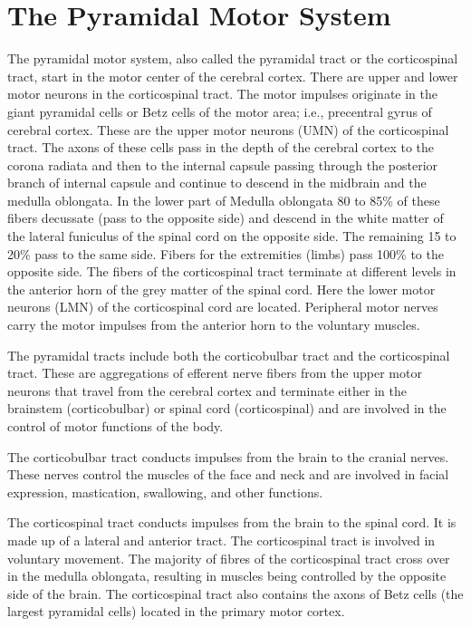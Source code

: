 \hypertarget{the-pyramidal-motor-system}{%
\section{The Pyramidal Motor System}\label{the-pyramidal-motor-system}}

The pyramidal motor system, also called the pyramidal tract or the corticospinal tract, start in the motor center of the cerebral cortex. There are upper and lower motor neurons in the corticospinal tract. The motor impulses originate in the giant pyramidal cells or Betz cells of the motor area; i.e., precentral gyrus of cerebral cortex. These are the upper motor neurons (UMN) of the corticospinal tract. The axons of these cells pass in the depth of the cerebral cortex to the corona radiata and then to the internal capsule passing through the posterior branch of internal capsule and continue to descend in the midbrain and the medulla oblongata. In the lower part of Medulla oblongata 80 to 85\% of these fibers decussate (pass to the opposite side) and descend in the white matter of the lateral funiculus of the spinal cord on the opposite side. The remaining 15 to 20\% pass to the same side. Fibers for the extremities (limbs) pass 100\% to the opposite side. The fibers of the corticospinal tract terminate at different levels in the anterior horn of the grey matter of the spinal cord. Here the lower motor neurons (LMN) of the corticospinal cord are located. Peripheral motor nerves carry the motor impulses from the anterior horn to the voluntary muscles.

The pyramidal tracts include both the corticobulbar tract and the corticospinal tract. These are aggregations of efferent nerve fibers from the upper motor neurons that travel from the cerebral cortex and terminate either in the brainstem (corticobulbar) or spinal cord (corticospinal) and are involved in the control of motor functions of the body.

The corticobulbar tract conducts impulses from the brain to the cranial nerves. These nerves control the muscles of the face and neck and are involved in facial expression, mastication, swallowing, and other functions.

The corticospinal tract conducts impulses from the brain to the spinal cord. It is made up of a lateral and anterior tract. The corticospinal tract is involved in voluntary movement. The majority of fibres of the corticospinal tract cross over in the medulla oblongata, resulting in muscles being controlled by the opposite side of the brain. The corticospinal tract also contains the axons of Betz cells (the largest pyramidal cells) located in the primary motor cortex.

